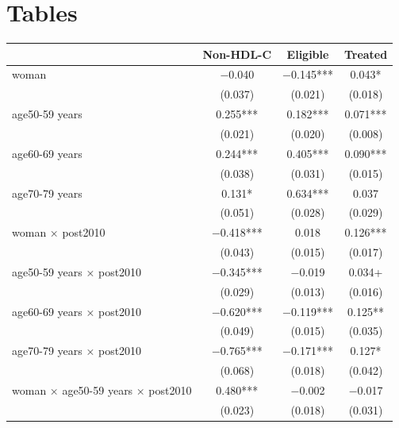 \documentclass[12pt]{article}
\begin{document}
\singlespacing



\clearpage

\onehalfspacing

\section*{Tables} \label{sec:tab}

\begin{table}[H]
    \centering
    \begin{tabular}[t]{lccc}
    \toprule
    & Non-HDL-C & Eligible & Treated\\
    \midrule
    woman & \num{-0.040} & \num{-0.145}*** & \num{0.043}*\\
     & (\num{0.037}) & (\num{0.021}) & (\num{0.018})\\
    age50-59 years & \num{0.255}*** & \num{0.182}*** & \num{0.071}***\\
     & (\num{0.021}) & (\num{0.020}) & (\num{0.008})\\
    age60-69 years & \num{0.244}*** & \num{0.405}*** & \num{0.090}***\\
     & (\num{0.038}) & (\num{0.031}) & (\num{0.015})\\
    age70-79 years & \num{0.131}* & \num{0.634}*** & \num{0.037}\\
     & (\num{0.051}) & (\num{0.028}) & (\num{0.029})\\
    woman × post2010 & \num{-0.418}*** & \num{0.018} & \num{0.126}***\\
     & (\num{0.043}) & (\num{0.015}) & (\num{0.017})\\
    age50-59 years × post2010 & \num{-0.345}*** & \num{-0.019} & \num{0.034}+\\
     & (\num{0.029}) & (\num{0.013}) & (\num{0.016})\\
    age60-69 years × post2010 & \num{-0.620}*** & \num{-0.119}*** & \num{0.125}**\\
     & (\num{0.049}) & (\num{0.015}) & (\num{0.035})\\
    age70-79 years × post2010 & \num{-0.765}*** & \num{-0.171}*** & \num{0.127}*\\
     & (\num{0.068}) & (\num{0.018}) & (\num{0.042})\\
    woman × age50-59 years × post2010 & \num{0.480}*** & \num{-0.002} & \num{-0.017}\\
     & (\num{0.023}) & (\num{0.018}) & (\num{0.031})\\

\end{tabular}
\end{table}
\end{document}
